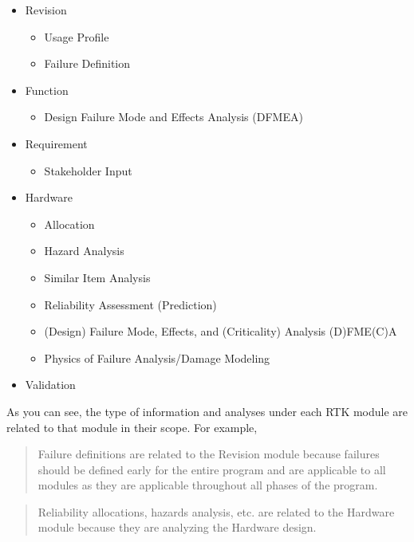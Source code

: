 \documentclass[twoside,12pt,letterpaper,openright]{book}
\begin{document}
\begin{itemize}
    \item Revision
        \begin{itemize}
            \item Usage Profile
            \item Failure Definition
        \end{itemize}
    \item Function
        \begin{itemize}
            \item Design Failure Mode and Effects Analysis (DFMEA)
        \end{itemize}
    \item Requirement
        \begin{itemize}
            \item Stakeholder Input
        \end{itemize}
    \item Hardware
        \begin{itemize}
            \item Allocation
            \item Hazard Analysis
            \item Similar Item Analysis
            \item Reliability Assessment (Prediction)
            \item (Design) Failure Mode, Effects, and (Criticality) Analysis (D)FME(C)A
            \item Physics of Failure Analysis/Damage Modeling
        \end{itemize}
    \item Validation
\end{itemize}

\noindent As you can see, the type of information and analyses under each RTK 
module are related to that module in their scope.  For example, 

\begin{quote}
Failure definitions are related to the Revision module because failures should 
be defined early for the entire program and are applicable to all modules as 
they are applicable throughout all phases of the program.
\end{quote}

\begin{quote}
Reliability allocations, hazards analysis, etc. are related to the Hardware
module because they are analyzing the Hardware design.
\end{quote}
\end{document}
